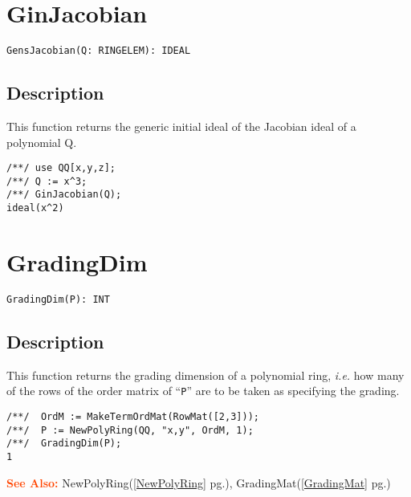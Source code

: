 \documentclass[a4paper]{mybook}
\newenvironment{command}{}{} %
\newcommand\SeeAlso{\par\textcolor{OrangeRed}{\textbf{\large See Also: }}}
\begin{document}
\section{GinJacobian}
\label{GinJacobian}
\begin{command} %


\begin{Verbatim}[label=syntax, rulecolor=\color{MidnightBlue},
frame=single]
GensJacobian(Q: RINGELEM): IDEAL 
\end{Verbatim}


\subsection*{Description}

This function returns the generic initial ideal of the Jacobian ideal of a polynomial Q.
\begin{Verbatim}[label=example, rulecolor=\color{PineGreen}, frame=single]
/**/ use QQ[x,y,z];	
/**/ Q := x^3;
/**/ GinJacobian(Q);
ideal(x^2)
\end{Verbatim}


\end{command} %

\section{GradingDim}
\label{GradingDim}
\begin{command} %


\begin{Verbatim}[label=syntax, rulecolor=\color{MidnightBlue},
frame=single]
GradingDim(P): INT
\end{Verbatim}


\subsection*{Description}

This function returns the grading dimension of a polynomial ring, \textit{i.e.}
how many of the rows of the order matrix of ``\verb&P&'' are to be taken as
specifying the grading.
\begin{Verbatim}[label=example, rulecolor=\color{PineGreen}, frame=single]
/**/  OrdM := MakeTermOrdMat(RowMat([2,3]));
/**/  P := NewPolyRing(QQ, "x,y", OrdM, 1);
/**/  GradingDim(P);
1
\end{Verbatim}


\SeeAlso %
  NewPolyRing(\ref{NewPolyRing} pg.\pageref{NewPolyRing}), 
    GradingMat(\ref{GradingMat} pg.\pageref{GradingMat})
\end{command} %
\end{document}
